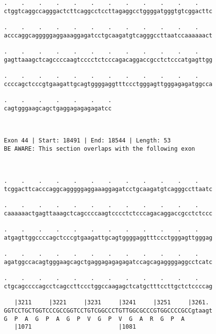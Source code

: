 \documentclass{article}
\begin{document}
\begin{Verbatim}
.    .    .    .    .    .    .    .    .    .    .    .    
ctggtcaggccagggactcttcaggcctccttagaggcctggggatgggtgtcggacttc
                                                            
.    .    .    .    .    .    .    .    .    .    .    .    
acccaggcagggggaggaaaggagatcctgcaagatgtcagggccttaatccaaaaaact
                                                            
.    .    .    .    .    .    .    .    .    .    .    .    
gagttaaagctcagccccaagtcccctctcccagacaggaccgcctctcccatgagttgg
                                                            
.    .    .    .    .    .    .    .    .    .    .    .    
ccccagctcccgtgaagattgcagtggggaggtttccctgggagttgggagagatggcca
                                                            
.    .    .    .    .    .    .
cagtgggaagcagctgaggagagagagatcc
                               
                               
 
Exon 44 | Start: 18491 | End: 18544 | Length: 53
BE AWARE: This section overlaps with the following exon



.    .    .    .    .    .    .    .    .    .    .    .    
tcggacttcacccaggcagggggaggaaaggagatcctgcaagatgtcagggccttaatc
                                                            
.    .    .    .    .    .    .    .    .    .    .    .    
caaaaaactgagttaaagctcagccccaagtcccctctcccagacaggaccgcctctccc
                                                            
.    .    .    .    .    .    .    .    .    .    .    .    
atgagttggccccagctcccgtgaagattgcagtggggaggtttccctgggagttgggag
                                                            
.    .    .    .    .    .    .    .    .    .    .    .    
agatggccacagtgggaagcagctgaggagagagagatccagcagaggggaggcctcatc
                                                            
.    .    .    .    .    .    .    .    .    .    .    .    
ctgcagccccagcctcagccttccctggccaagagctcatgctttccttgctctccccag
                                                            
   |3211     |3221     |3231     |3241     |3251     |3261. 
GGTCCTGCTGGTCCCGCCGGTCCTGTCGGCCCTGTTGGCGCCCGTGGCCCCGCCgtaagt
G  P  A  G  P  A  G  P  V  G  P  V  G  A  R  G  P  A        
   |1071                         |1081                      
  

\end{Verbatim}
\end{document}
